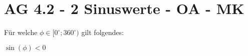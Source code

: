 \section{AG 4.2 - 2 Sinuswerte - OA - MK}

\begin{beispiel}[AG 4.2]{1} %
				Für welche $\phi \in [0^\circ;360^\circ)$ gilt folgendes:
				
				\begin{center}
				$\sin(\phi)<0$
				\end{center}
\end{beispiel}
